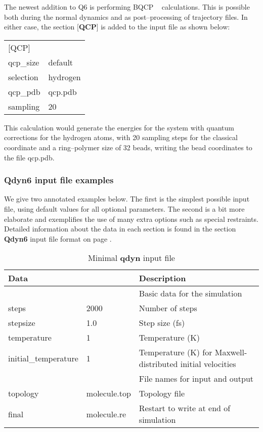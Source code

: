 \documentclass[a4paper,11pt]{article}
\let\origcite\cite
\def\cite#1{\unskip~\origcite{#1}}
\begin{document}
The newest addition to Q6 is performing BQCP \cite{Major2007a,Gao2008} calculations. This is
possible both during the normal dynamics and as post--processing of trajectory files. In either case,
the section [\textbf{QCP}] is added to the input file as shown below:
\begin{center}
	\begin{tabularx}{\textwidth}{|l X|}
		\hline
		\multicolumn{2}{|l|}{[QCP]} \\
		qcp{\_}size & default \\
		selection & hydrogen \\
		qcp{\_}pdb & qcp.pdb \\
		sampling & 20 \\ \hline
	\end{tabularx}
\end{center}
This calculation would generate the energies for the system with quantum corrections for the hydrogen
atoms, with 20 sampling steps for the classical coordinate and a ring--polymer size of 32 beads, 
writing the bead coordinates to the file qcp.pdb.


\subsubsection{\textbf{Qdyn6} input file examples}
We give two annotated examples below. The first is the simplest
possible input file, using default values for all optional
parameters. The second is a bit more elaborate and exemplifies the
use of many extra options such as special restraints. Detailed
information about the data in each section is found in the section
\textbf{Qdyn6} input file format on page
\pageref{subsubsec:qdyn_inp_file_form}.

\begin{longtable}{|p{105pt} p{60pt}|p{235pt}|}
\caption{Minimal \textbf{qdyn} input file}\\
  \hline \textbf{Data} &              & \textbf{Description} \\
  \endhead
  \hline [MD]          &              & Basic data for the simulation  \\
  \hline steps         & 2000         & Number of steps  \\
  \hline stepsize      & 1.0          & Step size (fs) \\
  \hline temperature   & 1            & Temperature (K) \\
  \hline initial{\_}temperature & 1   & Temperature (K) for Maxwell-distributed initial velocities \\
  \hline [files]       &              & File names for input and output \\
  \hline topology      & molecule.top & Topology file \\
  \hline final         & molecule.re  & Restart to write at end of simulation \\ \hline
\end{longtable}
\end{document}
